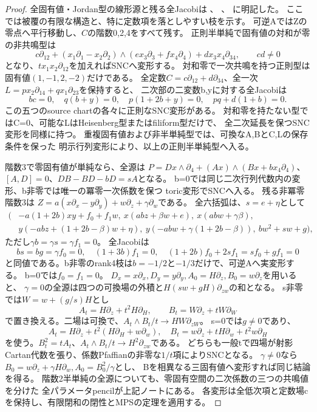 \documentclass[a4paper,11pt]{ltjsarticle}
\theoremstyle{definition}
\begin{document}
\begin{proof}
全固有値・Jordan型の線形源と残る全Jacobiは
、
、
に明記した。
ここでは被覆の有限な構造と、特に定数項を落としやすい枝を示す。
可逆AではZの零点へ平行移動し、$C$の階数0,2,4をすべて残す。
正則半単純で固有値の対和が零の非共鳴型は
\[
 c\partial_{12}+(x_1\partial_1-x_2\partial_2)
 \wedge(e x_3\partial_3+f x_4\partial_4)
 +d x_3x_4\partial_{34},\qquad cd\ne0
\]
となり、$t x_1x_2\partial_{12}$を加えればSNCへ変形する。
対和零で一次共鳴を持つ正則型は固有値$(1,-1,2,-2)$だけである。
全定数$C=c\partial_{12}+d\partial_{34}$、全一次
$L=p x_2\partial_{14}+q x_1\partial_{23}$を保持すると、
二次部の二変数b,yに対する全Jacobiは
\[
 bc=0,\quad q(b+y)=0,\quad p(1+2b+y)=0,\quad pq+d(1+b)=0.
\]
この五つのsource chartの各々に正則なSNC変形がある。
対和零を持たない型ではC=0、可能なLはHeisenberg型またはfiliform型だけで、
全二次延長を保つSNC変形を同様に持つ。
重複固有値および非半単純型では、可換なA,BとC,Lの保存条件を保った
明示行列変形により、以上の正則半単純型へ入る。

階数3で零固有値が単純なら、全源は
$P=Dx\wedge\partial_4+(Ax)\wedge(Bx+b x_4\partial_4)$、
$[A,D]=0$、$DB-BD-bD=sA$となる。
b=0では同じ二次行列代数内の変形、b非零では唯一の冪零一次係数を保つ
toric変形でSNCへ入る。
残る非冪零階数3は
$Z=a(x\partial_x-y\partial_y)+w\partial_z+\gamma\partial_w$である。
全六括弧は、$s=e+\eta$として
\[
\begin{split}
 (&-a(1+2b)xy+f_0+f_1w,\ x(abz+\beta w+e),\ x(abw+\gamma\beta),\\
  &y(-abz+(1+2b-\beta)w+\eta),\ y(-abw+\gamma(1+2b-\beta)),\ bw^2+sw+g),
\end{split}
\]
ただし$\gamma b=\gamma s=\gamma f_1=0$。
全Jacobiは
\[
 bs=bg=\gamma f_0=0,\quad(1+3b)f_1=0,\quad
 (1+2b)f_0+2sf_1=sf_0+gf_1=0
\]
と同値である。b非零のrank4枝は$b=-1/2$と$-1/3$だけで、可逆Aへ実変形する。
b=0では$f_0=f_1=0$。
$D_x=x\partial_x,D_y=y\partial_y,A_0=H\partial_z,B_0=w\partial_z$を用いると、
$\gamma=0$の全源は四つの可換場の外積と$H(sw+gH)\partial_{zw}$の和となる。
s非零では$W=w+(g/s)H$とし
\[
 A_t=H\partial_z+t^2H\partial_H,\qquad B_t=W\partial_z+tW\partial_W
\]
で置き換える。二場は可換で、$A_t\wedge B_t/t\to HW\partial_{zW}$。
s=0では$g\ne0$であり、
\[
 A_t=H\partial_z+t^2(H\partial_H+w\partial_w),\quad
 B_t=w\partial_z+tH\partial_w+t^2w\partial_H
\]
を使う。$B_t^2=tA_t$、$A_t\wedge B_t/t\to H^2\partial_{zw}$である。
どちらも一般tで四場が射影Cartan代数を張り、係数Pfaffianの非零な$1/t$項によりSNCとなる。
$\gamma\ne0$なら$B_0=w\partial_z+\gamma H\partial_w,A_0=B_0^2/\gamma$とし、
Bを相異なる三固有値へ変形すれば同じ結論を得る。
階数2半単純の全源についても、零固有空間の二次係数の三つの共鳴値を分けた
全パラメータpencilが上記ノートにある。
各変形は全低次項と定数場cを保持し、有限閉和の閉性とMPSの定理を適用する。
\end{proof}
\end{document}
